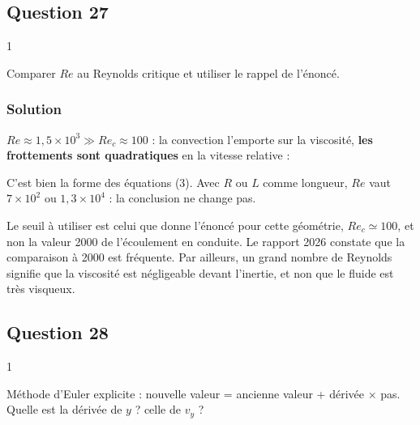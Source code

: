 \documentclass[11pt,a4paper]{article}
\newcommand{\equationajustee}[1]{%
  \sbox{\boiteequation}{$\displaystyle #1$}%
  \ifdim\wd\boiteequation>\linewidth
    \[\resizebox{\linewidth}{!}{\usebox{\boiteequation}}\]%
  \else
    \[#1\]%
  \fi}
\begin{document}
\hypertarget{question-27}{%
\subsection{Question 27}\label{question-27}}

\begin{indication}{1}

Comparer \(Re\) au Reynolds critique et utiliser le rappel de l'énoncé.

\end{indication}

\hypertarget{solution-26}{%
\subsubsection{Solution}\label{solution-26}}

\(Re \approx 1{,}5\times10^3 \gg Re_c \approx 100\) : la convection l'emporte sur la viscosité, \textbf{les frottements sont quadratiques} en la vitesse relative :

\equationajustee{\vec F = -\frac12\rho_a C_D S_{ref}\,\|\vec v - \vec u\|\,(\vec v - \vec u)}

C'est bien la forme des équations (3). Avec \(R\) ou \(L\) comme longueur, \(Re\) vaut \(7\times10^2\) ou \(1{,}3\times10^4\) : la conclusion ne change pas.

\begin{piege}

Le seuil à utiliser est celui que donne l'énoncé pour cette géométrie, \(Re_c \simeq 100\), et non la valeur 2000 de l'écoulement en conduite. Le rapport 2026 constate que la comparaison à 2000 est fréquente. Par ailleurs, un grand nombre de Reynolds signifie que la viscosité est négligeable devant l'inertie, et non que le fluide est très visqueux.

\end{piege}

\hypertarget{question-28}{%
\subsection{Question 28}\label{question-28}}

\begin{indication}{1}

Méthode d'Euler explicite : nouvelle valeur = ancienne valeur + dérivée × pas. Quelle est la dérivée de \(y\) ? celle de \(v_y\) ?

\end{indication}
\end{document}
